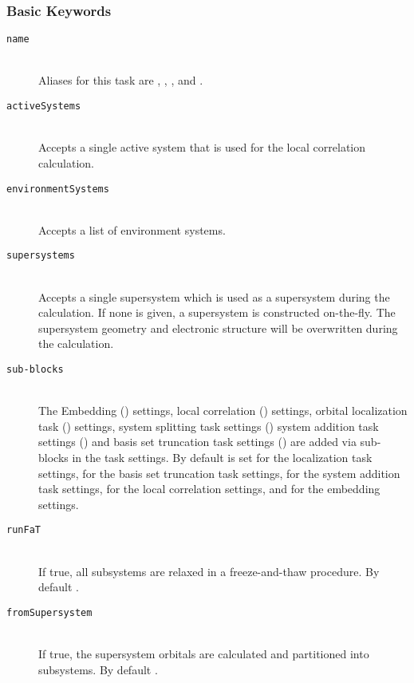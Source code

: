 \subsubsection{Basic Keywords}
\begin{description}
  \item [\texttt{name}]\hfill \\
    Aliases for this task are , , ,  and .
  \item [\texttt{activeSystems}]\hfill \\
    Accepts a single active system that is used for the local correlation calculation.
  \item [\texttt{environmentSystems}]\hfill \\
    Accepts a list of environment systems.
  \item [\texttt{supersystems}]\hfill \\
    Accepts a single supersystem which is used as a supersystem during the calculation.
    If none is given, a supersystem is constructed on-the-fly. The supersystem geometry and
    electronic structure will be overwritten during the calculation.
 \item [\texttt{sub-blocks}]\hfill \\
  The Embedding () settings, local correlation () settings,
  orbital localization task () settings, system splitting task settings ()
  system addition task settings () and basis set truncation task settings ()
  are added via sub-blocks in the task settings.
  By default  is set for the localization task settings,
   for the basis set truncation task settings,
   for the system addition task settings,
   for the local correlation settings,
  and  for the embedding settings.
 \item [\texttt{runFaT}]\hfill \\
 If true, all subsystems are relaxed in a freeze-and-thaw procedure. By default .
 \item [\texttt{fromSupersystem}]\hfill \\
 If true, the supersystem orbitals are calculated and partitioned into subsystems. By default .
\end{description}

